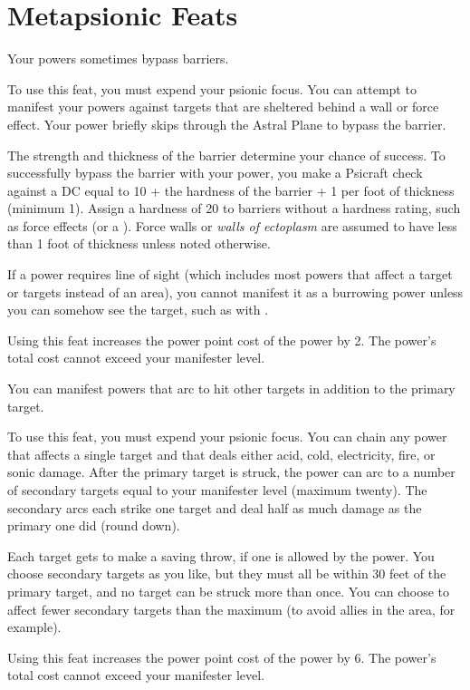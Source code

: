 \section{Metapsionic Feats}

{Your powers sometimes bypass barriers.}{}
{To use this feat, you must expend your psionic focus. You can attempt to manifest your powers against targets that are sheltered behind a wall or force effect. Your power briefly skips through the Astral Plane to bypass the barrier.

The strength and thickness of the barrier determine your chance of success. To successfully bypass the barrier with your power, you make a Psicraft check against a DC equal to 10 + the hardness of the barrier + 1 per foot of thickness (minimum 1). Assign a hardness of 20 to barriers without a hardness rating, such as force effects (or a ). Force walls or \emph{walls of ectoplasm} are assumed to have less than 1 foot of thickness unless noted otherwise.

If a power requires line of sight (which includes most powers that affect a target or targets instead of an area), you cannot manifest it as a burrowing power unless you can somehow see the target, such as with .

Using this feat increases the power point cost of the power by 2. The power's total cost cannot exceed your manifester level.}{}{}

{You can manifest powers that arc to hit other targets in addition to the primary target.}
{}
{To use this feat, you must expend your psionic focus. You can chain any power that affects a single target and that deals either acid, cold, electricity, fire, or sonic damage. After the primary target is struck, the power can arc to a number of secondary targets equal to your manifester level (maximum twenty). The secondary arcs each strike one target and deal half as much damage as the primary one did (round down).

Each target gets to make a saving throw, if one is allowed by the power. You choose secondary targets as you like, but they must all be within 30 feet of the primary target, and no target can be struck more than once. You can choose to affect fewer secondary targets than the maximum (to avoid allies in the area, for example).

Using this feat increases the power point cost of the power by 6. The power's total cost cannot exceed your manifester level.}{}{}

